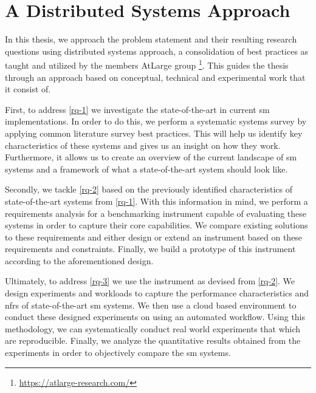 \section{A Distributed Systems Approach}
\label{sec:approach}


In this thesis, we approach the problem statement and their resulting research questions using distributed systems approach, a consolidation of best practices as taught and utilized by the members AtLarge group \footnote{\url{https://atlarge-research.com/}}. This guides the thesis through an approach based on conceptual, technical and experimental work that it consist of.

First, to address \ref{rq-1} we investigate the state-of-the-art in current \gls{sm} implementations. In order to do this, we perform a systematic systems survey by applying common literature survey best practices. This will help us identify key characteristics of these systems and gives us an insight on how they work. Furthermore, it allows us to create an overview of the current landscape of \gls{sm} systems and a framework of what a state-of-the-art system should look like. 

Secondly, we tackle \ref{rq-2} based on the previously identified characteristics of state-of-the-art systems from \ref{rq-1}. With this information in mind, we perform a requirements analysis for a benchmarking instrument capable of evaluating these systems in order to capture their core capabilities. We compare existing solutions to these requirements and either design or extend an instrument based on these requirements and constraints. Finally, we build a prototype of this instrument according to the aforementioned design.

Ultimately, to address \ref{rq-3} we use the instrument as devised from \ref{rq-2}. We design experiments and workloads to capture the performance characteristics and \glspl{nfr} of state-of-the-art \gls{sm} systems. We then use a cloud based environment to conduct these designed experiments on using an automated workflow. Using this methodology, we can systematically conduct real world experiments that which are reproducible. Finally, we analyze the quantitative results obtained from the experiments in order to objectively compare the \gls{sm} systems.